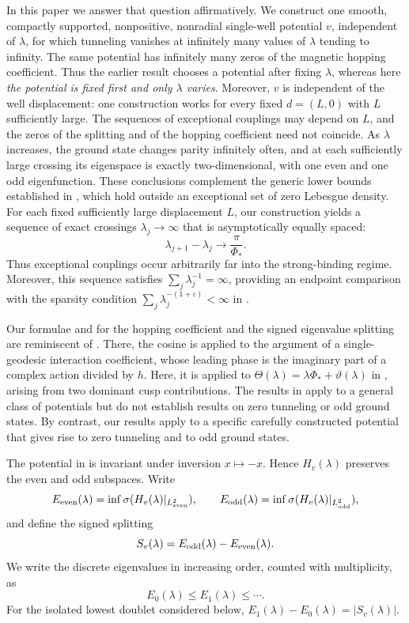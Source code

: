 \documentclass[11pt]{article}
\begin{document}
In this paper we answer that question affirmatively. We construct one
smooth, compactly supported, nonpositive, nonradial single-well potential
$v$, independent of $\lambda$, for which tunneling vanishes at infinitely
many values of $\lambda$ tending to infinity. The same potential has
infinitely many zeros of the magnetic hopping coefficient. Thus the
earlier result chooses a potential after fixing $\lambda$, whereas here
\emph{the potential is fixed first and only $\lambda$ varies}. Moreover,
$v$ is independent of the well displacement: one construction works for
every fixed $d=(L,0)$ with $L$ sufficiently large. The sequences of
exceptional couplings may depend on $L$, and the zeros of the splitting and
of the hopping coefficient need not coincide. As $\lambda$ increases, the
ground state changes parity infinitely often, and at each sufficiently large
crossing its eigenspace is exactly two-dimensional, with one even and one odd
eigenfunction. These conclusions complement the generic lower bounds established in
\cite{FSW-lower}, which hold outside an exceptional set of zero Lebesgue
density. For each fixed sufficiently large displacement $L$, our
construction yields a sequence of exact crossings $\lambda_j\to\infty$
that is asymptotically equally spaced:
\[
\lambda_{j+1}-\lambda_j\longrightarrow\frac{\pi}{\Phi_*}.
\]
Thus exceptional couplings occur arbitrarily far into the strong-binding
regime. Moreover, this sequence satisfies
$\sum_j\lambda_j^{-1}=\infty$, providing an endpoint comparison with the
sparsity condition
$\sum_j\lambda_j^{-(1+\varepsilon)}<\infty$ in
\cite[Theorem~1.1(2)]{FSW-lower}.



Our formulae  and
 for the hopping coefficient and the signed
eigenvalue splitting are reminiscent of \cite[(4.13)--(4.14)]{HS87}.
There, the cosine is applied to the argument of a single-geodesic
interaction coefficient, whose leading phase is the imaginary part of a
complex action divided by $h$. Here, it is applied to
$\Theta(\lambda)=\lambda\Phi_*+\vartheta(\lambda)$ in
, arising from two dominant cusp contributions.
The results in \cite{HS87} apply to a general class of potentials but do not establish results on zero tunneling or odd ground states. By contrast, our results apply to a specific carefully constructed potential that gives rise to zero tunneling and to odd ground states.

The potential in  is invariant under inversion
$x\mapsto-x$. Hence $H_v(\lambda)$ preserves the even and odd subspaces.
Write
\[
 E_{\rm even}(\lambda)=\inf\sigma(H_v(\lambda)|_{L^2_{\rm even}}),
 \qquad
 E_{\rm odd}(\lambda)=\inf\sigma(H_v(\lambda)|_{L^2_{\rm odd}}),
\]
and define the signed splitting
\begin{equation}\label{eq:signed-splitting-intro}
 S_v(\lambda)=E_{\rm odd}(\lambda)-E_{\rm even}(\lambda).
\end{equation}
We write the discrete eigenvalues in increasing order, counted with
multiplicity, as
\[
 E_0(\lambda)\le E_1(\lambda)\le\cdots .
\]
For the isolated lowest doublet considered below,
$E_1(\lambda)-E_0(\lambda)=|S_v(\lambda)|$.
\end{document}
